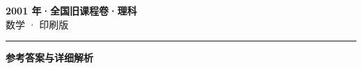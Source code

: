 \documentclass[zihao=5, a4paper]{ctexart}
\begin{document}
\begin{center}
  {\Large\bfseries 2001 年·全国旧课程卷·理科}\\[4pt]
  {\large 数学 · 印刷版}
\end{center}
\medskip
{}

\par\bigskip\hrule\bigskip
{}
\begin{center}{\large\bfseries 参考答案与详细解析}\end{center}
\smallskip

\end{document}
